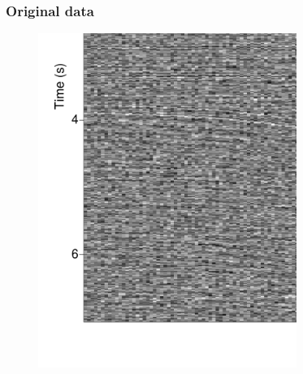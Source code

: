 




%
%


\begin{frame} \frametitle{Original data\\ }
\begin{figure}[t]
\centering
\includegraphics[width=0.75\textwidth,height=0.5\textwidth,keepaspectratio=false]{syn5d/Fig/original_data.pdf}
\end{figure}
\end{frame}

